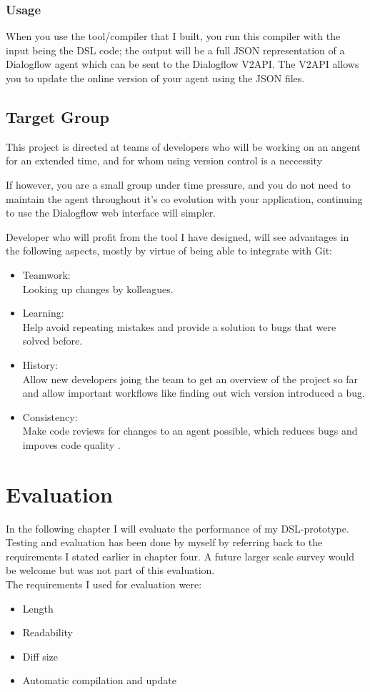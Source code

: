 \subsection{Usage}
When you use the tool/compiler that I built, you run this compiler with the input being the DSL code; the output will be a full JSON representation of a Dialogflow agent which can be sent to the Dialogflow V2API.
The V2API allows you to update the online version of your agent using the JSON files.


\section{Target Group}

This project is directed at teams of developers who will be working on an angent for an extended time, and for whom using version control is a neccessity

If however, you are a small group under time pressure, and you do not need to maintain the agent throughout it's co evolution with your application, continuing to use the Dialogflow web interface will simpler.

Developer who will profit from the tool I have designed, will see advantages in the following aspects, mostly by virtue of being able to integrate with Git:
\begin{itemize}
    \item Teamwork: \\ Looking up changes by kolleagues.
    \item Learning: \\ Help avoid repeating mistakes and provide a solution to bugs that were solved before.
    \item History: \\ Allow new developers joing the team to get an overview of the project so far and allow important workflows like finding out wich version introduced a bug.
    \item Consistency: \\ Make code reviews for changes to an agent possible, which reduces bugs and impoves code quality \citeNeeded.
\end{itemize}

\chapter{Evaluation}
In the following chapter I will evaluate the performance of my DSL-prototype.
Testing and evaluation has been done by myself by referring back to the requirements I stated earlier in chapter four. A future larger scale survey would be welcome but was not part of this evaluation.\\
The requirements I used for evaluation were:
\begin{itemize}
    \item Length
    \item Readability
    \item Diff size
    \item Automatic compilation and update
\end{itemize}

